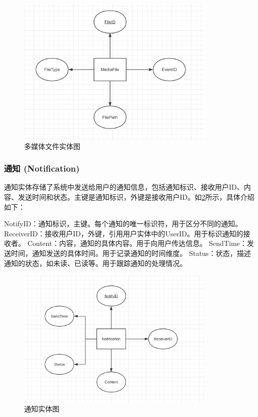 \begin{figure}[htbp]
    \centering
    \includegraphics[width=0.85\textwidth]{figures/db-img-03.png}
    \caption{多媒体文件实体图}
    \label{fig:entity-mediafile}
\end{figure}

\subsubsection{通知 (Notification)}

通知实体存储了系统中发送给用户的通知信息，包括通知标识、接收用户ID、内容、发送时间和状态。主键是通知标识，外键是接收用户ID。如\cref{fig:entity-notification}所示，具体介绍如下：

NotifyID：通知标识，主键。每个通知的唯一标识符，用于区分不同的通知。
ReceiverID：接收用户ID，外键，引用用户实体中的UserID。用于标识通知的接收者。
Content：内容，通知的具体内容。用于向用户传达信息。
SendTime：发送时间，通知发送的具体时间。用于记录通知的时间维度。
Status：状态，描述通知的状态，如未读、已读等。用于跟踪通知的处理情况。

\begin{figure}[htbp]
    \centering
    \includegraphics[width=0.85\textwidth]{figures/db-img-04.png}
    \caption{通知实体图}
    \label{fig:entity-notification}
\end{figure}

